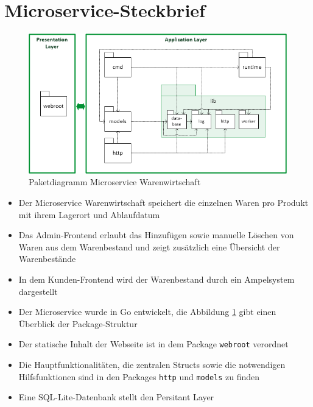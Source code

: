 \section*{Microservice-Steckbrief}
\label{sec: Microservice-Steckbrief}

\begin{figure}[H]
	\begin{center}
	\includegraphics[width=0.95 \textwidth]{./pics/struktur.png}
	\end{center}
	\caption{Paketdiagramm Microservice Warenwirtschaft}
	\label{pic: Microservice Warenwirtschaft}
\end{figure}


\begin{itemize}
	\item Der Microservice Warenwirtschaft speichert die einzelnen Waren pro Produkt mit ihrem Lagerort und Ablaufdatum
	\item Das Admin-Frontend erlaubt das Hinzufügen sowie manuelle Löschen von Waren aus dem Warenbestand und zeigt zusätzlich eine Übersicht der Warenbestände
	\item In dem Kunden-Frontend wird der Warenbestand durch ein Ampelsystem dargestellt
	\item Der Microservice wurde in Go entwickelt, die Abbildung \ref{pic: Microservice Warenwirtschaft} gibt einen Überblick der Package-Struktur
	\item Der statische Inhalt der Webseite ist in dem Package \texttt{webroot} verordnet
	\item Die Hauptfunktionalitäten, die zentralen Structs sowie die notwendigen Hilfsfunktionen sind in den Packages \texttt{http} und \texttt{models} zu finden
	\item Eine SQL-Lite-Datenbank stellt den Persitant Layer
\end{itemize}

